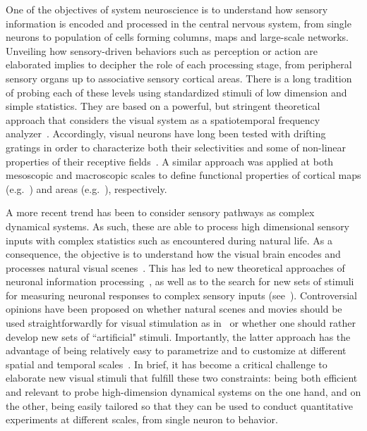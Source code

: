 \documentclass[a4paper,11pt]{article}%
\begin{document}
One of the objectives of system neuroscience is to understand how sensory information is encoded and processed in the central nervous system, from single neurons to population of cells forming columns, maps and large-scale networks. Unveiling how sensory-driven behaviors such as perception or action are elaborated implies to decipher the role of each processing stage, from peripheral sensory organs up to associative sensory cortical areas. There is a long tradition of probing each of these levels using standardized stimuli of low dimension and simple statistics. They are based on a powerful, but stringent theoretical approach that considers the visual system as a spatiotemporal frequency analyzer~\citep{Graham79,Watson83}. Accordingly, visual neurons have long been tested with drifting gratings in order to characterize both their selectivities and some of non-linear properties of their receptive fields~\citep{DeValois88}. A similar approach was applied at both mesoscopic and macroscopic scales to define functional properties of cortical maps (e.g.~\citep{Blasdel86,TsO90}) and areas (e.g.~\citep{Singh00,Henriksson08}), respectively.  

A more recent trend has been to consider sensory pathways as complex dynamical systems. As such, these are able to process high dimensional sensory inputs with complex statistics such as encountered during natural life. As a consequence, the objective is to understand how the visual brain encodes and processes natural visual scenes~\citep{Dan96}. This has led to new theoretical approaches of neuronal information processing~\citep{Field99}, as well as to the search for new sets of stimuli for measuring neuronal responses to complex sensory inputs (see~\citep{Touryan01,Wu06}). Controversial opinions have been proposed on whether natural scenes and movies should be used straightforwardly for visual stimulation as in~\citep{Felsen05} or whether one should rather develop new sets of ``artificial" stimuli. Importantly, the latter approach has the advantage of being relatively easy to parametrize and to customize at different spatial and temporal scales~\citep{Rust05}. In brief, it has become a critical challenge to elaborate new visual stimuli that fulfill these two constraints: being both efficient and relevant to probe high-dimension dynamical systems on the one hand, and on the other, being easily tailored so that they can be used to conduct quantitative experiments at different scales, from single neuron to behavior.
 
\end{document}
